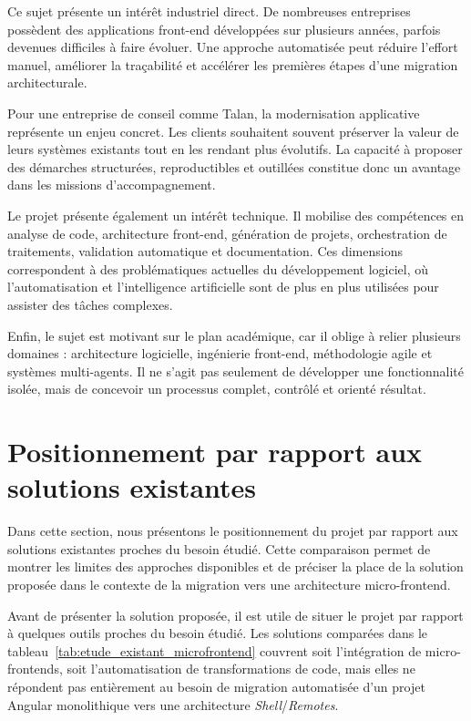 Ce sujet présente un intérêt industriel direct. De nombreuses entreprises possèdent des applications front-end développées sur plusieurs années, parfois devenues difficiles à faire évoluer. Une approche automatisée peut réduire l'effort manuel, améliorer la traçabilité et accélérer les premières étapes d'une migration architecturale.

Pour une entreprise de conseil comme Talan, la modernisation applicative représente un enjeu concret. Les clients souhaitent souvent préserver la valeur de leurs systèmes existants tout en les rendant plus évolutifs. La capacité à proposer des démarches structurées, reproductibles et outillées constitue donc un avantage dans les missions d'accompagnement.

Le projet présente également un intérêt technique. Il mobilise des compétences en analyse de code, architecture front-end, génération de projets, orchestration de traitements, validation automatique et documentation. Ces dimensions correspondent à des problématiques actuelles du développement logiciel, où l'automatisation et l'intelligence artificielle sont de plus en plus utilisées pour assister des tâches complexes.

Enfin, le sujet est motivant sur le plan académique, car il oblige à relier plusieurs domaines : architecture logicielle, ingénierie front-end, méthodologie agile et systèmes multi-agents. Il ne s'agit pas seulement de développer une fonctionnalité isolée, mais de concevoir un processus complet, contrôlé et orienté résultat.



\section{Positionnement par rapport aux solutions existantes}

Dans cette section, nous présentons le positionnement du projet par rapport aux solutions existantes proches du besoin étudié. Cette comparaison permet de montrer les limites des approches disponibles et de préciser la place de la solution proposée dans le contexte de la migration vers une architecture micro-frontend.

Avant de présenter la solution proposée, il est utile de situer le projet par rapport à quelques outils proches du besoin étudié. Les solutions comparées dans le tableau~\ref{tab:etude_existant_microfrontend} couvrent soit l'intégration de micro-frontends, soit l'automatisation de transformations de code, mais elles ne répondent pas entièrement au besoin de migration automatisée d'un projet Angular monolithique vers une architecture \textit{Shell}/\textit{Remotes}.

